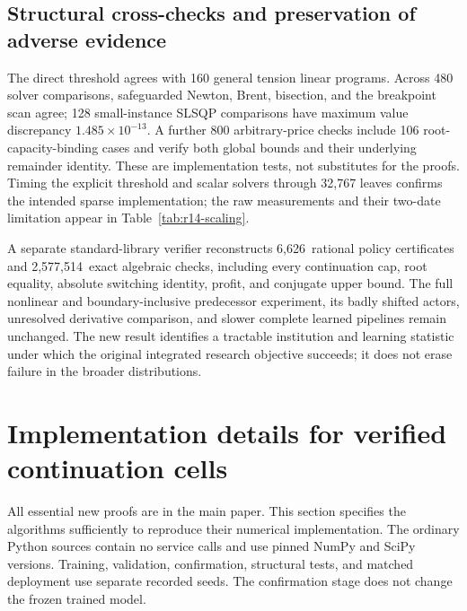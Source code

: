 \documentclass[11pt,letterpaper]{article}
\theoremstyle{definition}
\newcommand{\1}{\mathbf 1}
\newcommand{\RFourteenDenseError}{$1.485\times10^{-13}$}
\newcommand{\RFourteenCertificates}{6,626}
\newcommand{\RFourteenChecks}{2,577,514}
\begin{document}
\subsection{Structural cross-checks and preservation of adverse evidence}
The direct threshold agrees with 160 general tension linear programs. Across 480 solver comparisons, safeguarded Newton, Brent, bisection, and the breakpoint scan agree; 128 small-instance SLSQP comparisons have maximum value discrepancy \RFourteenDenseError. A further 800 arbitrary-price checks include 106 root-capacity-binding cases and verify both global bounds and their underlying remainder identity. These are implementation tests, not substitutes for the proofs. Timing the explicit threshold and scalar solvers through 32,767 leaves confirms the intended sparse implementation; the raw measurements and their two-date limitation appear in Table~\ref{tab:r14-scaling}.

A separate standard-library verifier reconstructs \RFourteenCertificates\ rational policy certificates and \RFourteenChecks\ exact algebraic checks, including every continuation cap, root equality, absolute switching identity, profit, and conjugate upper bound. The full nonlinear and boundary-inclusive predecessor experiment, its badly shifted actors, unresolved derivative comparison, and slower complete learned pipelines remain unchanged. The new result identifies a tractable institution and learning statistic under which the original integrated research objective succeeds; it does not erase failure in the broader distributions.



\section{Implementation details for verified continuation cells}\label{ec:r13-implementation}
All essential new proofs are in the main paper. This section specifies the algorithms sufficiently to reproduce their numerical implementation. The ordinary Python sources contain no service calls and use pinned NumPy and SciPy versions. Training, validation, confirmation, structural tests, and matched deployment use separate recorded seeds. The confirmation stage does not change the frozen trained model.
\end{document}
